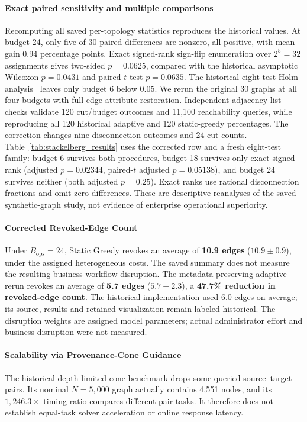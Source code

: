 \paragraph{Exact paired sensitivity and multiple comparisons}
Recomputing all saved per-topology statistics reproduces the historical values. At budget 24, only five of 30 paired differences are nonzero, all positive, with mean gain 0.94 percentage points. Exact signed-rank sign-flip enumeration over $2^5=32$ assignments gives two-sided $p=0.0625$, compared with the historical asymptotic Wilcoxon $p=0.0431$ and paired $t$-test $p=0.0635$. The historical eight-test Holm analysis~\cite{holm1979simple} leaves only budget 6 below 0.05. We rerun the original 30 graphs at all four budgets with full edge-attribute restoration. Independent adjacency-list checks validate 120 cut/budget outcomes and 11,100 reachability queries, while reproducing all 120 historical adaptive and 120 static-greedy percentages. The correction changes nine disconnection outcomes and 24 cut counts. Table~\ref{tab:stackelberg_results} uses the corrected row and a fresh eight-test family: budget 6 survives both procedures, budget 18 survives only exact signed rank (adjusted $p=0.02344$, paired-$t$ adjusted $p=0.05138$), and budget 24 survives neither (both adjusted $p=0.25$). Exact ranks use rational disconnection fractions and omit zero differences. These are descriptive reanalyses of the saved synthetic-graph study, not evidence of enterprise operational superiority.

\paragraph{Corrected Revoked-Edge Count}
Under $B_{\text{ops}} = 24$, Static Greedy revokes an average of \textbf{10.9 edges} ($10.9 \pm 0.9$), under the assigned heterogeneous costs. The saved summary does not measure the resulting business-workflow disruption. The metadata-preserving adaptive rerun revokes an average of \textbf{5.7 edges} ($5.7 \pm 2.3$), a \textbf{47.7\% reduction in revoked-edge count}. The historical implementation used 6.0 edges on average; its source, results and retained visualization remain labeled historical. The disruption weights are assigned model parameters; actual administrator effort and business disruption were not measured.



\paragraph{Scalability via Provenance-Cone Guidance}
The historical depth-limited cone benchmark drops some queried source--target pairs. Its nominal $N=5,000$ graph actually contains 4,551 nodes, and its $1,246.3\times$ timing ratio compares different pair tasks. It therefore does not establish equal-task solver acceleration or online response latency.


